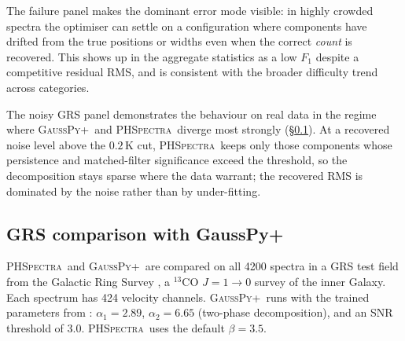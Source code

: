 \documentclass[twocolumn,twocolappendix,aj]{aastex631}
\newcommand{\phspectra}{\textsc{PHSpectra}}
\newcommand{\gausspyp}{\textsc{GaussPy+}}
\begin{document}
The failure panel makes the dominant error mode visible: in highly
crowded spectra the optimiser can settle on a configuration where
components have drifted from the true positions or widths even when the
correct \emph{count} is recovered.  This shows up in the aggregate
statistics as a low $F_1$ despite a competitive residual RMS, and is
consistent with the broader difficulty trend across categories.

The noisy GRS panel demonstrates the behaviour on real data in the
regime where \gausspyp\ and \phspectra\ diverge most strongly
(\S\ref{sec:grs}).  At a recovered noise level above the
$0.2\,\text{K}$ cut, \phspectra\ keeps only those components whose
persistence and matched-filter significance exceed the threshold, so the
decomposition stays sparse where the data warrant; the recovered RMS is
dominated by the noise rather than by under-fitting.

\subsection{GRS comparison with GaussPy+}\label{sec:grs}

\phspectra\ and \gausspyp\ are compared on all 4200 spectra in a GRS test field
from the Galactic Ring Survey \citep[GRS;][]{Jackson2006}, a ${}^{13}$CO
$J = 1 \to 0$ survey of the inner Galaxy.  Each spectrum has 424 velocity
channels.  \gausspyp\ runs with the trained parameters from
\citet{Riener2019}: $\alpha_1 = 2.89$, $\alpha_2 = 6.65$ (two-phase
decomposition), and an SNR threshold of 3.0.  \phspectra\ uses the default
$\beta = 3.5$.
\end{document}
